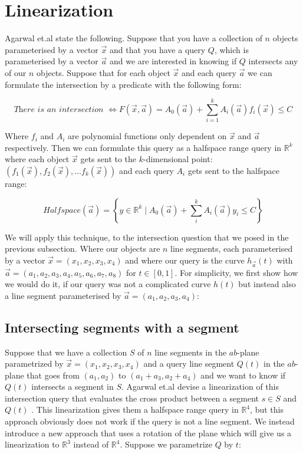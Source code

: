 \documentclass{article}
\newcommand{\etal}{et.al\xspace}
\begin{document}
\section{Linearization}

Agarwal \etal state the following.
Suppose that you have a collection of $n$ objects parameterised by a vector $\vec{x}$ and that you have a query $Q$, which is parameterised by a vector $\vec{a}$ and we are interested in knowing if $Q$ intersects any of our $n$ objects.
Suppose that for each object $\vec{x}$ and each query $\vec{a}$ we can formulate the intersection by a predicate with the following form:

\begin{equation}
    \textit{There is an intersection } \iff F(\vec{x}, \vec{a}) = A_0(\vec{a}) + \sum_{i=1}^k A_i(\vec{a})f_i(\vec{x}) \le C
\end{equation}

Where $f_i$ and $A_i$ are polynomial functions only dependent on $
\vec{x}$ and $\vec{a}$ respectively. Then we can formulate this query as a halfspace range query in $\mathbb{R}^k$ where each object $\vec{x}$ gets sent to the $k$-dimensional point: $(f_1(\vec{x}), f_2(\vec{x}), \dots f_k(\vec{x}))$ and each query $A_i$ gets sent to the halfspace range:

\begin{equation}
    Halfspace(\vec{a}) = \left\{y \in \mathbb{R}^k \mid A_0(\vec{a})  + \sum_i^k A_i(\vec{a})y_i  \le C \right\}
\end{equation}

We will apply this technique, to the intersection question that we posed in the previous subsection. Where our objects are $n$ line segments, each parameterised by a vector $\vec{x} = (x_1, x_2, x_3, x_4)$ and where our query is the curve $h_{\vec{a}}(t)$ with $\vec{a} = (a_1, a_2, a_3, a_4, a_5, a_6, a_7, a_8)$ for $t \in [0,1]$.  For simplicity, we first show how we would do it, if our query was not a complicated curve $h(t)$ but instead also a line segment parameterised by $\vec{a} = (a_1, a_2, a_3, a_4)$:

\subsection{Intersecting segments with a segment}

Suppose that we have a collection $S$ of $n$ line segments in the $ab$-plane parametrized by $\vec{x} = (x_1, x_2, x_3, x_4)$ and a query line segment $Q(t)$ in the $ab$-plane that goes from $(a_1, a_2)$ to $(a_1 + a_3, a_2 + a_4)$ and we want to know if $Q(t)$ intersects a segment in $S$. Agarwal \etal devise a linearization of this intersection query that evaluates the cross product between a segment $s \in S$ and $Q(t)$ \cite{agarwal2013range}. This linearization gives them a halfspace range query in $\mathbb{R}^4$, but this approach obviously does not work if the query is not a line segment. We instead introduce a new approach that uses a rotation of the plane which will give us a linearization to $\mathbb{R}^3$ instead of $\mathbb{R}^4$.
Suppose we parametrize $Q$ by $t$:
\end{document}
